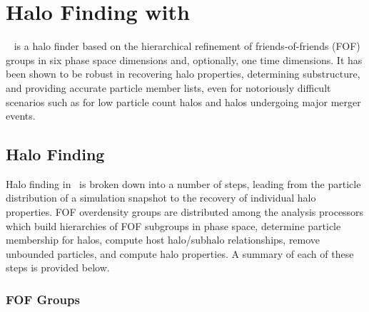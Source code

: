 
%
%

\section{Halo Finding with \rockstar}
\label{sec:rockstar}



\rockstar\ \citep[Robust Overdensity Calculation using K-Space Topoloogically Adaptive Refinement; ][]{2013ApJ...762..109B} is a halo finder based on the hierarchical refinement of friends-of-friends (FOF) groups in six phase space dimensions and, optionally, one time dimensions.  It has been shown \citep{2011MNRAS.415.2293K} to be robust in recovering halo properties, determining substructure, and providing accurate particle member lists, even for notoriously difficult scenarios such as for low particle count halos and halos undergoing major merger events.




\subsection{Halo Finding}
\label{subsec:rockstar--halo_finding}


Halo finding in \rockstar\ is broken down into a number of steps, leading from the particle distribution of a simulation snapshot to the recovery of individual halo properties.  FOF overdensity groups are distributed among the analysis processors which build hierarchies of FOF subgroups in phase space, determine particle membership for halos, compute host halo/subhalo relationships, remove unbounded particles, and compute halo properties.  A summary of each of these steps is provided below.



\subsubsection{FOF Groups}
\label{subsubsec:rockstar--halo_finding--fof_groups}


